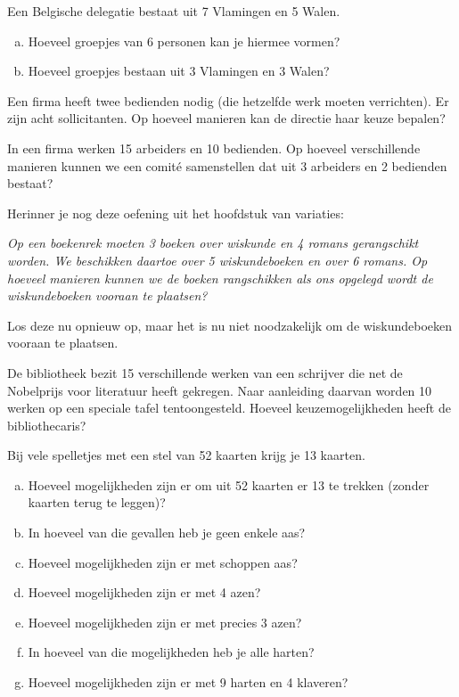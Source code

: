 \documentclass[12pt,a4paper,twoside]{article}
\begin{document}
\begin{oefening}
Een Belgische delegatie bestaat uit 7 Vlamingen en 5 Walen.
\begin{enumerate}[(a)]
  \item Hoeveel groepjes van 6 personen kan je hiermee vormen?
  \item Hoeveel groepjes bestaan uit 3 Vlamingen en 3 Walen?
\end{enumerate}
\end{oefening}

\begin{oefening}
Een firma heeft twee bedienden nodig (die hetzelfde werk moeten verrichten). Er zijn acht sollicitanten. Op hoeveel manieren kan de directie haar keuze bepalen?
\end{oefening}

\begin{oefening}
In een firma werken 15 arbeiders en 10 bedienden. Op hoeveel verschillende manieren kunnen we een comité samenstellen dat uit 3 arbeiders en 2 bedienden bestaat?
\end{oefening}

\begin{oefening}
Herinner je nog deze oefening uit het hoofdstuk van variaties:

{\em Op een boekenrek moeten 3 boeken over wiskunde en 4 romans gerangschikt worden. We beschikken daartoe over 5 wiskundeboeken en over 6 romans. Op hoeveel manieren kunnen we de boeken rangschikken als ons opgelegd wordt de wiskundeboeken vooraan te plaatsen?}

Los deze nu opnieuw op, maar het is nu niet noodzakelijk om de wiskundeboeken vooraan te plaatsen.
\end{oefening}

\begin{oefening}
De bibliotheek bezit 15 verschillende werken van een schrijver die net de Nobelprijs voor literatuur heeft gekregen. Naar aanleiding daarvan worden 10 werken op een speciale tafel tentoongesteld. Hoeveel keuzemogelijkheden heeft de bibliothecaris?
\end{oefening}

\begin{oefening}
Bij vele spelletjes met een stel van 52 kaarten krijg je 13 kaarten.
\begin{enumerate}[(a)]
  \item Hoeveel mogelijkheden zijn er om uit 52 kaarten er 13 te trekken (zonder kaarten terug te leggen)?
  \item In hoeveel van die gevallen heb je geen enkele aas?
  \item Hoeveel mogelijkheden zijn er met schoppen aas?
  \item Hoeveel mogelijkheden zijn er met 4 azen?
  \item Hoeveel mogelijkheden zijn er met precies 3 azen?
  \item In hoeveel van die mogelijkheden heb je alle harten?
  \item Hoeveel mogelijkheden zijn er met 9 harten en 4 klaveren?
\end{enumerate}
\end{oefening}
\end{document}
